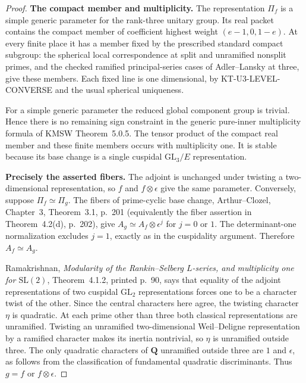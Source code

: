 \documentclass[11pt,a4paper]{article}
\theoremstyle{definition}
\renewcommand{\paragraph}[1]{\par\smallskip\noindent\textbf{#1}\quad\ignorespaces}
\begin{document}
\begin{proof}
\paragraph{The compact member and multiplicity.}
The representation $\Pi_f$ is a simple generic parameter for
the rank-three unitary group.  Its real packet contains the
compact member of coefficient highest weight $(e-1,0,1-e)$.
At every finite place it has a member fixed by the prescribed
standard compact subgroup: the spherical local correspondence
at split and unramified nonsplit primes, and the checked
ramified principal-series cases of Adler--Lansky at three,
give these members.  Each fixed line is one dimensional,
by KT-U3-LEVEL-CONVERSE and the usual spherical uniqueness.

For a simple generic parameter the reduced global component
group is trivial.  Hence there is no remaining sign constraint
in the generic pure-inner multiplicity formula of KMSW
Theorem~5.0.5.  The tensor product of the compact real member
and these finite members occurs with multiplicity one.  It
is stable because its base change is a single cuspidal
$\mathrm{GL}_3/E$ representation.

\paragraph{Precisely the asserted fibers.}
The adjoint is unchanged under twisting a two-dimensional
representation, so $f$ and $f\otimes\epsilon$ give the same
parameter.  Conversely, suppose $\Pi_f\simeq\Pi_g$.
The fibers of prime-cyclic base change, Arthur--Clozel,
Chapter~3, Theorem~3.1, p.~201 (equivalently the fiber assertion
in Theorem~4.2(d), p.~202), give
$A_g\simeq A_f\otimes\epsilon^j$ for $j=0$ or $1$.
The determinant-one normalization excludes $j=1$, exactly
as in the cuspidality argument.  Therefore $A_f\simeq A_g$.

Ramakrishnan, \emph{Modularity of the Rankin--Selberg $L$-series,
and multiplicity one for $\mathrm{SL}(2)$},
Theorem~4.1.2, printed p.~90, says that equality of the adjoint
representations of two cuspidal $\mathrm{GL}_2$ representations
forces one to be a character twist of the other.  Since the
central characters here agree, the twisting character $\eta$
is quadratic.  At each prime other than three both classical
representations are unramified.  Twisting an unramified
two-dimensional Weil--Deligne representation by a ramified
character makes its inertia nontrivial, so $\eta$ is unramified
outside three.  The only quadratic characters of $\mathbf Q$
unramified outside three are $1$ and $\epsilon$, as follows
from the classification of fundamental quadratic discriminants.
Thus $g=f$ or $f\otimes\epsilon$.


\end{proof}
\end{document}
